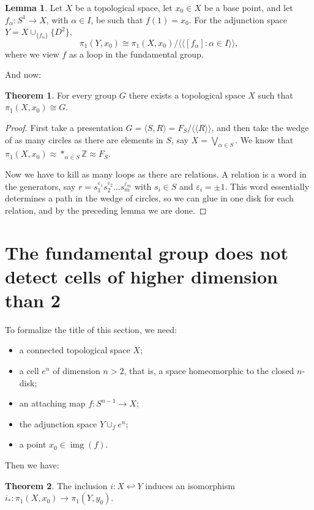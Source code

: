 \documentclass{book}
\theoremstyle{definition}
\newtheorem*{lema}{Lemma}
\newtheorem*{teo}{Theorem}
\newcommand{\Z}{\mathbb{Z}}
\DeclareMathOperator{\img}{img}
\begin{document}
\begin{lema}
Let $X$ be a topological space, let $x_0\in X$ be a base
point, and let $f_\alpha:S^1\to X$, with $\alpha\in I$, be
such that $f(1)=x_0$. For the adjunction space
$Y=X\cup_{\{f_\alpha\}}\{D^2\}$,
$$
\pi_1(Y,x_0)\cong
\pi_1(X,x_0)
\big/
\langle\langle [f_\alpha]:\alpha\in I\rangle\rangle,
$$
where we view $f$ as a loop in the fundamental group.
\end{lema}

And now:

\begin{teo}
For every group $G$ there exists a topological space $X$
such that $\pi_1(X,x_0)\cong G$.
\end{teo}

\begin{proof}
First take a presentation
$G=\langle S,R\rangle=F_S/\langle\langle R\rangle\rangle$,
and then take the wedge of as many circles as there are
elements in $S$, say $X=\bigvee_{\alpha\in S}$. We know that
$\pi_1(X,x_0)\approx *_{\alpha\in S}\Z\approx F_S$.

Now we have to kill as many loops as there are relations. A
relation is a word in the generators, say
$r=s_1^{\varepsilon_1}s_2^{\varepsilon_2}\ldots
s_m^{\varepsilon_m}$ with $s_i\in S$ and
$\varepsilon_i=\pm1$. This word essentially determines a
path in the wedge of circles, so we can glue in one disk for
each relation, and by the preceding lemma we are done.
\end{proof}

\section{The fundamental group does not detect cells of
higher dimension than 2}

To formalize the title of this section, we need:
\begin{itemize}
\item a connected topological space $X$;
\item a cell $e^n$ of dimension $n>2$, that is, a space
homeomorphic to the closed $n$-disk;
\item an attaching map $f:S^{n-1}\to X$;
\item the adjunction space $Y\cup_f e^n$;
\item a point $x_0\in\img(f)$.
\end{itemize}
Then we have:

\begin{teo}
The inclusion $i:X\hookleftarrow Y$ induces an isomorphism
$i_*:\pi_1(X,x_0)\to\pi_1(Y,y_0)$.
\end{teo}
\end{document}

